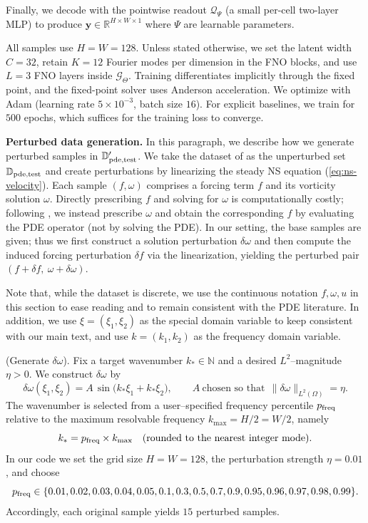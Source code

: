 \documentclass{amsart} %
\def\eqref#1{equation~\ref{#1}}
\def\vy{{\bm{y}}}
\def\sD{{\mathbb{D}}}
\def\sN{{\mathbb{N}}}
\def\sR{{\mathbb{R}}}
\def\cG{{\mathcal{G}}}
\def\cQ{{\mathcal{Q}}}
\theoremstyle{definition}
\theoremstyle{remark}
\renewcommand{\eqref}[1]{\textup{(\ref{#1})}}
\begin{document}
Finally, we decode with the pointwise readout $\cQ_{\Psi}$ (a small per-cell two-layer MLP) to produce $\vy \in \sR^{H\times W\times1}$ where $\Psi$ are learnable parameters.

All samples use \(H=W=128\). Unless stated otherwise, we set the latent width \(C=32\), retain \(K=12\) Fourier modes per dimension in the FNO blocks, and use \(L=3\) FNO layers inside \(\cG_\Theta\). Training differentiates implicitly through the fixed point, and the fixed-point solver uses Anderson acceleration. We optimize with Adam (learning rate \(5\times10^{-3}\), batch size \(16\)). For explicit baselines, we train for \(500\) epochs, which suffices for the training loss to converge.


\textbf{Perturbed data generation.}
In this paragraph, we describe how we generate perturbed samples in $\sD^\prime_{\textup{pde,test}}$. We take the dataset of \cite{marwah2023deep} as the unperturbed set $\sD_{\textup{pde,test}}$ and create perturbations by linearizing the steady NS equation \eqref{eq:ns-velocity}. Each sample $(f,\omega)$ comprises a forcing term $f$ and its vorticity solution $\omega$. Directly prescribing $f$ and solving for $\omega$ is computationally costly; following \cite{marwah2023deep}, we instead prescribe $\omega$ and obtain the corresponding $f$ by evaluating the PDE operator (not by solving the PDE). In our setting, the base samples are given; thus we first construct a solution perturbation $\delta\omega$ and then compute the induced forcing perturbation $\delta f$ via the linearization, yielding the perturbed pair $(f+\delta f,\ \omega+\delta\omega)$.

Note that, while the dataset is discrete, we use the continuous notation $f,\omega,u$ in this section to ease reading and to remain consistent with the PDE literature. In addition, we use $\xi = (\xi_1,\xi_2)$ as the special domain variable to keep consistent with our main text, and use $k=(k_1,k_2)$ as the frequency domain variable. 

(Generate $\delta\omega$).
Fix a target wavenumber $k_\ast\in\sN$ and a desired $L^2$–magnitude $\eta>0$. We construct $\delta \omega$ by
\[
\delta\omega(\xi_1,\xi_2)=A\,\sin\!\big(k_\ast \xi_1 + k_\ast \xi_2\big),
\qquad
A\ \text{chosen so that}\ \ \|\delta\omega\|_{L^2(\Omega)}=\eta.
\]
The wavenumber is selected from a user–specified frequency percentile $p_{\textup{freq}}$ relative to the maximum resolvable frequency $k_{\mathrm{max}}=H/2=W/2$, namely
\[
k_\ast = p_{\textup{freq}} \times k_{\mathrm{max}}
\quad\text{(rounded to the nearest integer mode).}
\]
In our code we set the grid size $H=W=128$, the perturbation strength $\eta=0.01$, and choose
\[
p_{\textup{freq}} \in \{0.01, 0.02, 0.03, 0.04, 0.05, 0.1, 0.3, 0.5, 0.7, 0.9, 0.95, 0.96, 0.97, 0.98, 0.99\}.
\]
Accordingly, each original sample yields $15$ perturbed samples.
\end{document}
